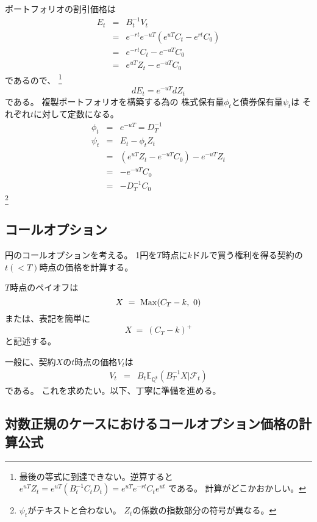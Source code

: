 \documentclass[uplatex,a4j,12pt,dvipdfmx]{jsarticle}
\begin{document}
ポートフォリオの割引価格は
%
%
\begin{eqnarray*}
	E_{t}
	&=&
	B^{-1}_{t} V_{t}
	\\ &=&
	e^{-rt}
	e^{-uT}
	\left(
	e^{uT} C_{t}
	- e^{rt} C_{0}
	\right)
	\\ &=&
	e^{-rt} C_{t} - e^{-uT} C_{0}
	\\ &=&
	e^{uT} Z_{t} - e^{-uT} C_{0}
\end{eqnarray*}
%
%
であるので、
\footnote{最後の等式に到達できない。逆算すると
	$e^{uT}Z_{t}
		=
		e^{uT}(B_{t}^{-1} C_{t} D_{t})
		=
		e^{uT} e^{-rt} C_{t} e^{ut}
	$
	である。
	計算がどこかおかしい。
}
$$dE_{t} = e^{-uT} dZ_{t}$$
である。
複製ポートフォリオを構築する為の
株式保有量$\phi_{t}$と債券保有量$\psi_{t}$は
それぞれ$t$に対して定数になる。
%
%
\begin{eqnarray*}
	\phi_{t} &=& e^{-uT} = D_{T}^{-1}
	\\[3mm]
	\psi_{t} &=& E_{t} - \phi_{t} Z_{t}
	\\ &=&
	(e^{uT} Z_{t} - e^{-uT} C_{0}) - e^{-uT} Z_{t}
	\\ &=&
	- e^{-uT} C_{0}
	\\ &=&
	- D_{T}^{-1} C_{0}
\end{eqnarray*}
%
%
\footnote{
	$\psi_{t}$がテキストと合わない。
	$Z_{t}$の係数の指数部分の符号が異なる。
}

\subsection{コールオプション}

円のコールオプションを考える。
1円を$T$時点に$k$ドルで買う権利を得る契約の
$t(<T)$時点の価格を計算する。

$T$時点のペイオフは
$$
	X
	\ = \
	{\rm Max}(C_{T} - k , \ 0)
$$
または、表記を簡単に
$$
	X
	\ = \
	(C_{T} - k )^{+}
$$
と記述する。

一般に、契約$X$の$t$時点の価格$V_{t}$は
%
%
\begin{eqnarray*}
	V_{t}
	&=&
	B_{t}
	\mathbb{E}_{\mathbb{Q}^{ \$ }}
	( B_{T}^{-1} X | \mathcal{F}_{t} )
\end{eqnarray*}
%
%
である。
これを求めたい。以下、丁寧に準備を進める。

\subsection*{対数正規のケースにおけるコールオプション価格の計算公式}
\end{document}
